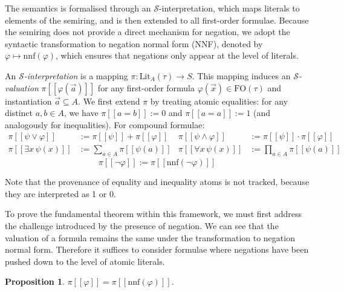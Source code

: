 \documentclass[oneside, 11pt]{amsbook}
\theoremstyle{plain}
\newtheorem{prop}[thm]{Proposition}
\theoremstyle{definition}
\theoremstyle{remark}
\begin{document}
The semantics is formalised through an $\mathcal{S}$-interpretation, which maps literals to elements of the semiring, and is then extended to all first-order formulae. Because the semiring does not provide a direct mechanism for negation, we adopt the syntactic transformation to negation normal form (NNF), denoted by $\varphi \mapsto \text{nnf}(\varphi)$, which ensures that negations only appear at the level of literals.

\begin{defn}
    An \emph{$\mathcal{S}$-interpretation} is a mapping $\pi : \text{Lit}_{A}(\tau) \to S$. This mapping induces an \emph{$\mathcal{S}$-valuation} $\pi [\![ \varphi(\vec{a}) ]\!]$ for any first-order formula $\varphi(\vec{x}) \in \text{FO}(\tau)$ and instantiation $\vec{a} \subseteq A$. We first extend $\pi$ by treating atomic equalities: for any distinct $a, b \in A$, we have $\pi[\![ a = b ]\!] := 0$ and $\pi[\![ a = a ]\!] := 1$ (and analogously for inequalities). For compound formulae:
    \[
        \begin{aligned}
            \pi [\![ \psi \lor \varphi ]\!]   & := \pi [\![ \psi ]\!] + \pi [\![ \varphi ]\!]
                                              &
            \pi [\![ \psi \land \varphi ]\!]  & := \pi [\![ \psi ]\!] \cdot \pi [\![ \varphi ]\!] \\
            \pi [\![ \exists x\, \psi(x) ]\!] & := \sum_{a \in A} \pi [\![ \psi(a) ]\!]
                                              &
            \pi [\![ \forall x\, \psi(x) ]\!] & := \prod_{a \in A} \pi [\![ \psi(a) ]\!]
        \end{aligned}
    \]
    \[
        \pi [\![ \neg \varphi ]\!]
        := \pi [\![ \mathrm{nnf}(\neg \varphi) ]\!]
    \]
\end{defn}

Note that the provenance of equality and inequality atoms is not tracked, because they are interpreted as 1 or 0.

To prove the fundamental theorem within this framework, we must first address the challenge introduced by the presence of negation. We can see that the valuation of a formula remains the same under the transformation to negation normal form. Therefore it suffices to consider formulae where negations have been pushed down to the level of atomic literals.

\begin{prop}
    \label{prop:phiequalsnnfphi}
    $\pi [\![ \varphi ]\!] = \pi [\![ \mathrm{nnf}(\varphi) ]\!]$.
\end{prop}
\end{document}
